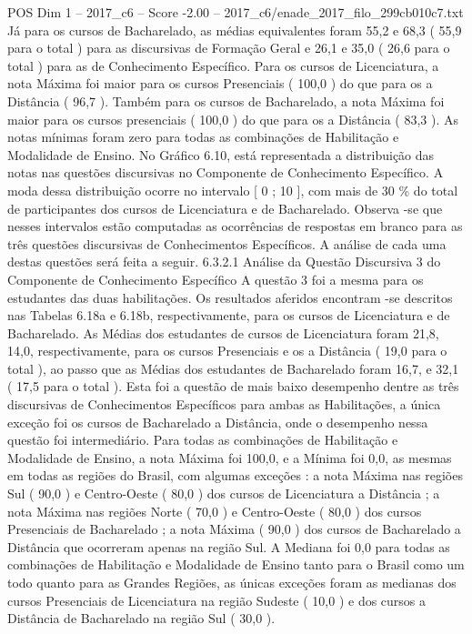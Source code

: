 \begin{textsample}{POS Dim 1 – 2017\_c6 – Score -2.00 – 2017\_c6/enade\_2017\_filo\_299cb010c7.txt}
Já para os cursos de Bacharelado, as médias equivalentes foram 55,2 e 68,3 ( 55,9 para o total ) para as discursivas de Formação Geral e 26,1 e 35,0 ( 26,6 para o total ) para as de Conhecimento Específico.
Para os cursos de Licenciatura, a nota Máxima foi maior para os cursos Presenciais ( 100,0 ) do que para os a Distância ( 96,7 ).
Também para os cursos de Bacharelado, a nota Máxima foi maior para os cursos presenciais ( 100,0 ) do que para os a Distância ( 83,3 ).
As notas mínimas foram zero para todas as combinações de Habilitação e Modalidade de Ensino.
No Gráfico 6.10, está representada a distribuição das notas nas questões discursivas no Componente de Conhecimento Específico.
A moda dessa distribuição ocorre no intervalo [ 0 ; 10 ], com mais de 30 \% do total de participantes dos cursos de Licenciatura e de Bacharelado.
Observa -se que nesses intervalos estão computadas as ocorrências de respostas em branco para as três questões discursivas de Conhecimentos Específicos.
A análise de cada uma destas questões será feita a seguir. 6.3.2.1 Análise da Questão Discursiva 3 do Componente de Conhecimento Específico A questão 3 foi a mesma para os estudantes das duas habilitações.
Os resultados aferidos encontram -se descritos nas Tabelas 6.18a e 6.18b, respectivamente, para os cursos de Licenciatura e de Bacharelado.
As Médias dos estudantes de cursos de Licenciatura foram 21,8, 14,0, respectivamente, para os cursos Presenciais e os a Distância ( 19,0 para o total ), ao passo que as Médias dos estudantes de Bacharelado foram 16,7, e 32,1 ( 17,5 para o total ).
Esta foi a questão de mais baixo desempenho dentre as três discursivas de Conhecimentos Específicos para ambas as Habilitações, a única exceção foi os cursos de Bacharelado a Distância, onde o desempenho nessa questão foi intermediário.
Para todas as combinações de Habilitação e Modalidade de Ensino, a nota Máxima foi 100,0, e a Mínima foi 0,0, as mesmas em todas as regiões do Brasil, com algumas exceções : a nota Máxima nas regiões Sul ( 90,0 ) e Centro-Oeste ( 80,0 ) dos cursos de Licenciatura a Distância ; a nota Máxima nas regiões Norte ( 70,0 ) e Centro-Oeste ( 80,0 ) dos cursos Presenciais de Bacharelado ; a nota Máxima ( 90,0 ) dos cursos de Bacharelado a Distância que ocorreram apenas na região Sul.
A Mediana foi 0,0 para todas as combinações de Habilitação e Modalidade de Ensino tanto para o Brasil como um todo quanto para as Grandes Regiões, as únicas exceções foram as medianas dos cursos Presenciais de Licenciatura na região Sudeste ( 10,0 ) e dos cursos a Distância de Bacharelado na região Sul ( 30,0 ).

\end{textsample}

